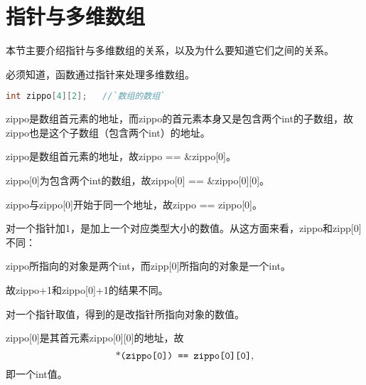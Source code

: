\section{指针与多维数组}
\begin{frame}[fragile]\ft{\secname}
本节主要介绍指针与多维数组的关系，以及为什么要知道它们之间的关系。
\vspace{0.1in}

\textcolor{acolor1}{必须知道，函数通过指针来处理多维数组。}
\end{frame}

\begin{frame}[fragile]\ft{\secname}
\begin{lstlisting}[language=c,backgroundcolor=\color{red!20}]
int zippo[4][2];   //`数组的数组`
\end{lstlisting}
{\tf zippo}是数组首元素的地址，而{\tf zippo}的首元素本身又是包含两个{\tf int}的子数组，故{\tf zippo}也是这个子数组（包含两个{\tf int}）的地址。
\end{frame}

\begin{frame}[fragile]\ft{\secname}
 {\tf zippo}是数组首元素的地址，故{\tf zippo == \&zippo[0]}。\vspace{0.1in}
 
 {\tf zippo[0]}为包含两个{\tf int}的数组，故{\tf zippo[0] == \&zippo[0][0]}。\vspace{0.1in}
 
 {\tf zippo}与{\tf zippo[0]}开始于同一个地址，故{\tf zippo == zippo[0]}。

\end{frame}

\begin{frame}[fragile]\ft{\secname}
\textcolor{acolor1}{对一个指针加1，是加上一个对应类型大小的数值。}从这方面来看，{\tf zippo}和{\tf zipp[0]}不同：\vspace{0.15in}
 
{\tf zippo}所指向的对象是两个{\tf int}，而{\tf zipp[0]}所指向的对象是一个{\tf int}。
\vspace{0.15in}
 
故{\tf zippo+1}和{\tf zippo[0]+1}的结果不同。
\end{frame}

\begin{frame}[fragile]\ft{\secname}
\textcolor{acolor1}{对一个指针取值，得到的是改指针所指向对象的数值。}\vspace{0.15in}
 
{\tf zippo[0]}是其首元素{\tf zippo[0][0]}的地址，故
$$
\mbox{*\ttfamily(zippo[0]) == zippo[0][0]},
$$
即一个{\tf int}值。 
\end{frame}

